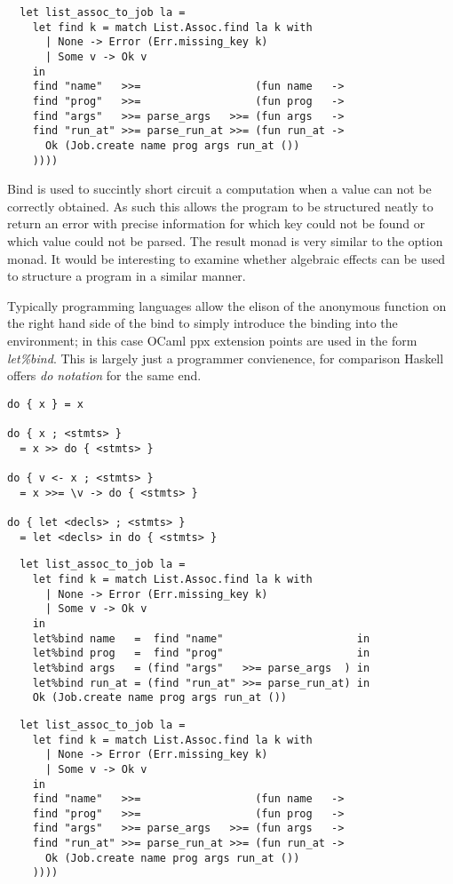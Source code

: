 \begin{verbatim}
  let list_assoc_to_job la =
    let find k = match List.Assoc.find la k with
      | None -> Error (Err.missing_key k)
      | Some v -> Ok v
    in
    find "name"   >>=                  (fun name   ->
    find "prog"   >>=                  (fun prog   ->
    find "args"   >>= parse_args   >>= (fun args   ->
    find "run_at" >>= parse_run_at >>= (fun run_at ->
      Ok (Job.create name prog args run_at ())
    ))))
\end{verbatim}

Bind is used to succintly short circuit a computation when a value can not be
correctly obtained. As such this allows the program to be structured neatly to return
an error with precise information for which key could not be found or which value could
not be parsed. The result monad is very similar to the option monad. It would be interesting
to examine whether algebraic effects can be used to structure a program in a similar manner.

Typically programming languages allow the elison of the anonymous function on the right hand side
of the bind to simply introduce the binding into the environment;
in this case OCaml ppx extension points are used in the form \textit{let\%bind}.
This is largely just a programmer convienence,
for comparison Haskell offers \textit{do notation} for the same end.

\begin{verbatim}
do { x } = x
 
do { x ; <stmts> }
  = x >> do { <stmts> }
 
do { v <- x ; <stmts> }
  = x >>= \v -> do { <stmts> }
 
do { let <decls> ; <stmts> }
  = let <decls> in do { <stmts> }
\end{verbatim}
\begin{verbatim}
  let list_assoc_to_job la =
    let find k = match List.Assoc.find la k with
      | None -> Error (Err.missing_key k)
      | Some v -> Ok v
    in
    let%bind name   =  find "name"                     in
    let%bind prog   =  find "prog"                     in
    let%bind args   = (find "args"   >>= parse_args  ) in
    let%bind run_at = (find "run_at" >>= parse_run_at) in
    Ok (Job.create name prog args run_at ())
\end{verbatim}

\begin{verbatim}
  let list_assoc_to_job la =
    let find k = match List.Assoc.find la k with
      | None -> Error (Err.missing_key k)
      | Some v -> Ok v
    in
    find "name"   >>=                  (fun name   ->
    find "prog"   >>=                  (fun prog   ->
    find "args"   >>= parse_args   >>= (fun args   ->
    find "run_at" >>= parse_run_at >>= (fun run_at ->
      Ok (Job.create name prog args run_at ())
    ))))
\end{verbatim}



